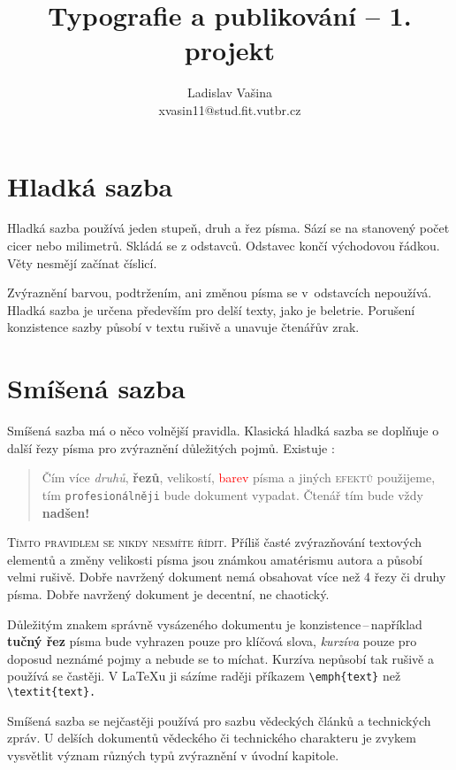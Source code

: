 \documentclass[a4paper, 10pt, twocolumn]{article}
\title{Typografie a publikování -- 1. projekt}
\author{Ladislav Vašina \\ xvasin11@stud.fit.vutbr.cz}
\date{}
\begin{document}
\maketitle

\section{Hladká sazba}
Hladká sazba používá jeden stupeň, druh a řez písma.
Sází se na stanovený počet cicer nebo milimetrů.
Skládá se z od\-stav\-ců. Odstavec končí východovou řádkou.
Věty nesmějí začínat číslicí.

    Zvýraznění barvou, podtržením, ani změnou písma se v~odstavcích nepoužívá.
Hladká sazba je určena především pro delší texty, jako je beletrie.
Porušení konzistence sazby působí v textu rušivě a unavuje čtenářův zrak.

\section{Smíšená sazba}
Smíšená sazba má o něco volnější pravidla.
Klasická hladká sazba se doplňuje o další řezy písma pro zvýraznění důležitých pojmů.
Existuje :

\begin{quotation}
Čím více \emph {druhů}, \textbf {řezů}, {\tiny velikostí}, \textcolor{red}{barev} písma a 
jiných \textsc{efektů} použijeme, tím \texttt{profesionálněji}
bude {\Large {}\selectfont dokument} vypadat.
{\huge Č}{\LARGE t}{\Large e}{\large n}á{\small ř} {\footnotesize t}{\scriptsize í}{\tiny m} bude vždy {\Huge \textbf{nadšen!}}
\end{quotation}

    \textsc{Tímto pravidlem se nikdy nesmíte řídit.} Příliš 
časté zvýrazňování textových elementů a změny velikosti písma jsou známkou amatérismu autora a působí velmi rušivě.
Dobře navržený dokument nemá obsahovat více než 4 řezy či druhy písma.
Dobře navržený dokument je decentní, ne chaotický.

    Důležitým znakem správně vysázeného dokumentu je 
konzistence\,--\,například \textbf{tučný řez} písma bude vyhrazen pouze pro klíčová slova, \emph{kurzíva} pouze pro doposud
neznámé pojmy a nebude se to míchat.
Kurzíva nepůsobí tak rušivě a používá se častěji.
V \LaTeX u ji sázíme raději příkazem {\verb!\emph{text}!} než {\verb!\textit{text}.!}

    Smíšená sazba se nejčastěji používá pro sazbu vědeckých článků a technických zpráv.
U delších dokumentů vědeckého či technického charakteru je zvykem vysvětlit význam různých typů zvýraznění v úvodní kapitole.
\end{document}
